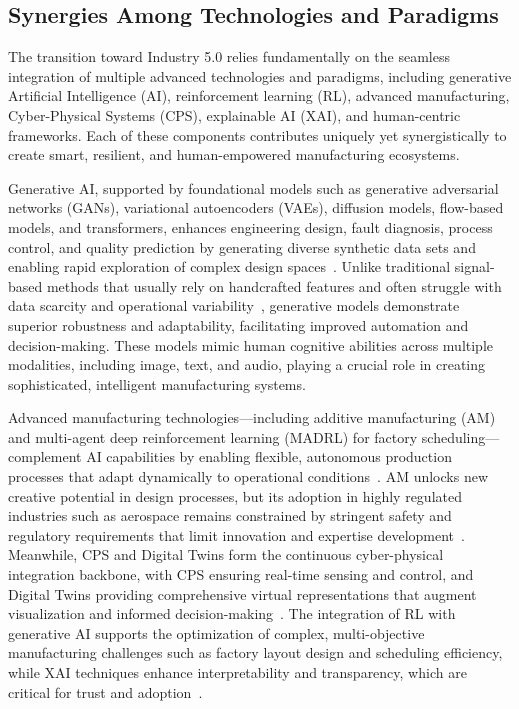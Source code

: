 \documentclass[sigconf]{acmart}
\begin{document}
\subsection{Synergies Among Technologies and Paradigms}

The transition toward Industry 5.0 relies fundamentally on the seamless integration of multiple advanced technologies and paradigms, including generative Artificial Intelligence (AI), reinforcement learning (RL), advanced manufacturing, Cyber-Physical Systems (CPS), explainable AI (XAI), and human-centric frameworks. Each of these components contributes uniquely yet synergistically to create smart, resilient, and human-empowered manufacturing ecosystems.

Generative AI, supported by foundational models such as generative adversarial networks (GANs), variational autoencoders (VAEs), diffusion models, flow-based models, and transformers, enhances engineering design, fault diagnosis, process control, and quality prediction by generating diverse synthetic data sets and enabling rapid exploration of complex design spaces~\cite{ref1}. Unlike traditional signal-based methods that usually rely on handcrafted features and often struggle with data scarcity and operational variability~\cite{ref4}, generative models demonstrate superior robustness and adaptability, facilitating improved automation and decision-making. These models mimic human cognitive abilities across multiple modalities, including image, text, and audio, playing a crucial role in creating sophisticated, intelligent manufacturing systems.

Advanced manufacturing technologies—including additive manufacturing (AM) and multi-agent deep reinforcement learning (MADRL) for factory scheduling—complement AI capabilities by enabling flexible, autonomous production processes that adapt dynamically to operational conditions~\cite{ref16,ref23}. AM unlocks new creative potential in design processes, but its adoption in highly regulated industries such as aerospace remains constrained by stringent safety and regulatory requirements that limit innovation and expertise development~\cite{ref16}. Meanwhile, CPS and Digital Twins form the continuous cyber-physical integration backbone, with CPS ensuring real-time sensing and control, and Digital Twins providing comprehensive virtual representations that augment visualization and informed decision-making~\cite{ref23}. The integration of RL with generative AI supports the optimization of complex, multi-objective manufacturing challenges such as factory layout design and scheduling efficiency, while XAI techniques enhance interpretability and transparency, which are critical for trust and adoption~\cite{ref12}.
\end{document}
